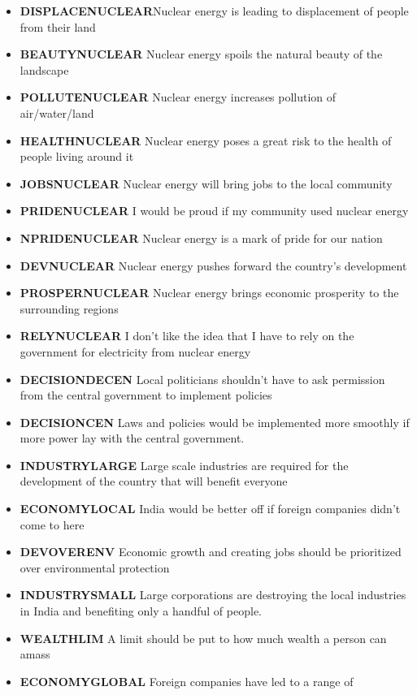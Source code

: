 \documentclass[
]{article}
\begin{document}
\begin{itemize}
\item
  \textbf{DISPLACENUCLEAR}Nuclear energy is leading to displacement of
  people from their land
\item
  \textbf{BEAUTYNUCLEAR} Nuclear energy spoils the natural beauty of the
  landscape
\item
  \textbf{POLLUTENUCLEAR} Nuclear energy increases pollution of
  air/water/land
\item
  \textbf{HEALTHNUCLEAR} Nuclear energy poses a great risk to the health
  of people living around it
\item
  \textbf{JOBSNUCLEAR} Nuclear energy will bring jobs to the local
  community
\item
  \textbf{PRIDENUCLEAR} I would be proud if my community used nuclear
  energy
\item
  \textbf{NPRIDENUCLEAR} Nuclear energy is a mark of pride for our
  nation
\item
  \textbf{DEVNUCLEAR} Nuclear energy pushes forward the country's
  development
\item
  \textbf{PROSPERNUCLEAR} Nuclear energy brings economic prosperity to
  the surrounding regions
\item
  \textbf{RELYNUCLEAR} I don't like the idea that I have to rely on the
  government for electricity from nuclear energy
\item
  \textbf{DECISIONDECEN} Local politicians shouldn't have to ask
  permission from the central government to implement policies
\item
  \textbf{DECISIONCEN} Laws and policies would be implemented more
  smoothly if more power lay with the central government.
\item
  \textbf{INDUSTRYLARGE} Large scale industries are required for the
  development of the country that will benefit everyone
\item
  \textbf{ECONOMYLOCAL} India would be better off if foreign companies
  didn't come to here
\item
  \textbf{DEVOVERENV} Economic growth and creating jobs should be
  prioritized over environmental protection
\item
  \textbf{INDUSTRYSMALL} Large corporations are destroying the local
  industries in India and benefiting only a handful of people.
\item
  \textbf{WEALTHLIM} A limit should be put to how much wealth a person
  can amass
\item
  \textbf{ECONOMYGLOBAL} Foreign companies have led to a range of

\end{itemize}
\end{document}
